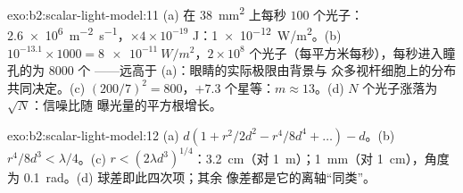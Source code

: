 \begin{solution}{exo:b2:scalar-light-model:11}
(a) 在 \qty{38}{mm^2} 上每秒 $100$ 个光子：\qty{2.6e6}{m^{-2}.s^{-1}}，$\times4 \times
10^{-19}$ J：\qty{1e-12}{W/m^2}。(b) $10^{-13.1} \times 1000 = \qty{8e-11}{W/m^2}$，$2 \times 10^8$
个光子（每平方米每秒），每秒进入瞳孔的为 $8000$ 个
——远高于 (a)：眼睛的实际极限由背景与
众多视杆细胞上的分布共同决定。(c) $(200/7)^2 = 800$，$+7.3$ 个星等：$m \approx
13$。(d) $N$ 个光子涨落为 $\sqrt N$：信噪比随
曝光量的平方根增长。
\end{solution}

\begin{solution}{exo:b2:scalar-light-model:12}
(a) $d(1 + r^2/2d^2 - r^4/8d^4 + \dots) - d$。(b) $r^4/8d^3 < \lambda/4$。(c) $r <
(2\lambda d^3)^{1/4}$：\qty{3.2}{cm}（对 \qty{1}{m}）；\qty{1}{mm}（对 \qty{1}{cm}），角度为
\qty{0.1}{rad}。(d) 球差即此四次项；其余
像差都是它的离轴“同类”。
\end{solution}

